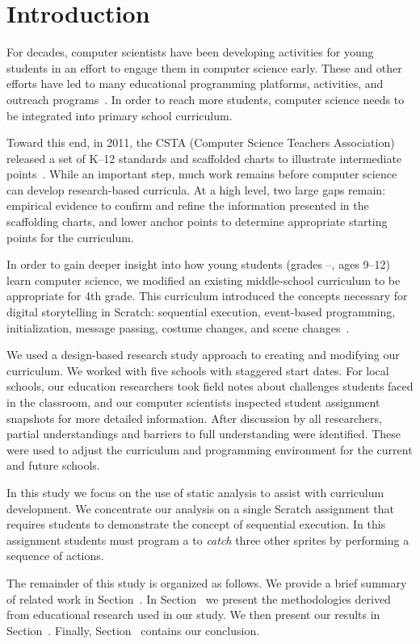 \section{Introduction}
For decades, computer scientists have been developing activities for young
students in an effort to engage them in computer science early. These and other
efforts have led to many educational programming platforms, activities, and
outreach programs~\cite{wayanoutpost, georgiaoutreach,
  Franklin:2011:ATA:1953163.1953295, Maloney:2010:SPL:1868358.1868363,
  Dann:2000:MCP:343048.343070, Hood:2005:TPL:1067445.1067454, csunplugged}. In
order to reach more students, computer science needs to be integrated into
primary school curriculum.

Toward this end, in 2011, the CSTA (Computer Science Teachers Association)
released a set of K--12 standards and scaffolded charts to illustrate
intermediate points~\cite{cstastandards}. While an important step, much work
remains before computer science can develop research-based curricula. At a high
level, two large gaps remain: empirical evidence to confirm and refine the
information presented in the scaffolding charts, and lower anchor points to
determine appropriate starting points for the curriculum.

In order to gain deeper insight into how young students (grades
--, ages 9--12) learn computer science, we modified an existing
middle-school curriculum to be appropriate for 4th grade. This curriculum
introduced the concepts necessary for digital storytelling in Scratch:
sequential execution, event-based programming, initialization, message passing,
costume changes, and scene changes~\cite{Franklin:2013:SBO}.

We used a design-based research study approach to creating and modifying our
curriculum. We worked with five schools with staggered start dates. For local
schools, our education researchers took field notes about challenges students
faced in the classroom, and our computer scientists inspected student
assignment snapshots for more detailed information. After discussion by all
researchers, partial understandings and barriers to full understanding were
identified. These were used to adjust the curriculum and programming
environment for the current and future schools.

In this study we focus on the use of static analysis to assist with curriculum
development. We concentrate our analysis on a single Scratch assignment that
requires students to demonstrate the concept of sequential execution. In this
assignment students must program a \net{} to \emph{catch} three other sprites
by performing a sequence of actions.

The remainder of this study is organized as follows. We provide a brief summary
of related work in Section~. In
Section~ we present the methodologies derived from
educational research used in our study. We then present our results in
Section~. Finally, Section~
contains our conclusion.
